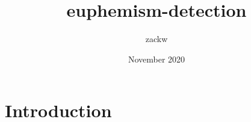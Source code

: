 \documentclass{article}
\title{euphemism-detection}
\author{zackw }
\date{November 2020}
\begin{document}
\maketitle

\section{Introduction}
\end{document}
